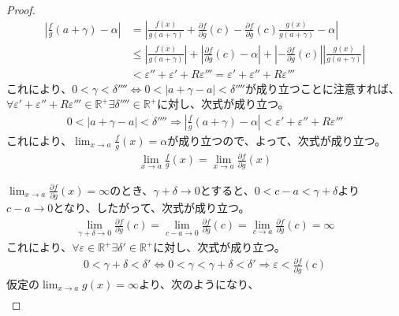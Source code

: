 \documentclass[dvipdfmx]{jsarticle}
\begin{document}
\begin{proof}
\begin{align*}
\left| \frac{f}{g}\left( a + \gamma \right) - \alpha \right| &= \left| \frac{f(x)}{g\left( a + \gamma \right)} + \frac{\partial f}{\partial g}(c) - \frac{\partial f}{\partial g}(c)\frac{g(x)}{g\left( a + \gamma \right)} - \alpha \right|\\
&\leq \left| \frac{f(x)}{g\left( a + \gamma \right)} \right| + \left| \frac{\partial f}{\partial g}(c) - \alpha \right| + \left| - \frac{\partial f}{\partial g}(c) \right|\left| \frac{g(x)}{g\left( a + \gamma \right)} \right|\\
&< \varepsilon'' + \varepsilon' + R\varepsilon''' = \varepsilon' + \varepsilon'' + R\varepsilon'''
\end{align*}
これにより、$0 < \gamma < \delta'''' \Leftrightarrow 0 < \left| a + \gamma - a \right| < \delta''''$が成り立つことに注意すれば、$\forall\varepsilon' + \varepsilon'' + R\varepsilon''' \in \mathbb{R}^{+}\exists\delta'''' \in \mathbb{R}^{+}$に対し、次式が成り立つ。
\begin{align*}
0 < \left| a + \gamma - a \right| < \delta'''' \Rightarrow \left| \frac{f}{g}\left( a + \gamma \right) - \alpha \right| < \varepsilon' + \varepsilon'' + R\varepsilon'''
\end{align*}
これにより、$\lim_{x \rightarrow a}{\frac{f}{g}(x)} = \alpha$が成り立つので、よって、次式が成り立つ。
\begin{align*}
\lim_{x \rightarrow a}{\frac{f}{g}(x)} = \lim_{x \rightarrow a}{\frac{\partial f}{\partial g}(x)}
\end{align*}\par
$\lim_{x \rightarrow a}{\frac{\partial f}{\partial g}(x)} = \infty$のとき、$\gamma + \delta \rightarrow 0$とすると、$0 < c - a < \gamma + \delta$より$c - a \rightarrow 0$となり、したがって、次式が成り立つ。
\begin{align*}
\lim_{\gamma + \delta \rightarrow 0}{\frac{\partial f}{\partial g}(c)} = \lim_{c - a \rightarrow 0}{\frac{\partial f}{\partial g}(c)} = \lim_{c \rightarrow a}{\frac{\partial f}{\partial g}(c)} = \infty
\end{align*}
これにより、$\forall\varepsilon \in \mathbb{R}^{+}\exists\delta' \in \mathbb{R}^{+}$に対し、次式が成り立つ。
\begin{align*}
0 < \gamma + \delta < \delta' \Leftrightarrow 0 < \gamma < \gamma + \delta < \delta' \Rightarrow \varepsilon < \frac{\partial f}{\partial g}(c)
\end{align*}
仮定の$\lim_{x \rightarrow a}{g(x)} = \infty$より、次のようになり、
\begin{align*}

\end{align*}
\end{proof}
\end{document}
